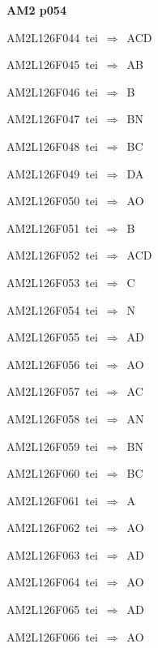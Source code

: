 \par\vfill\eject
{\bf\hfill AM2 p054\hfill\hbox{}}\par\bigskip
{\sixrm AM2L126F044\ {\sixit tei}\ }$\Rightarrow$\ ACD\par\smallskip
{\sixrm AM2L126F045\ {\sixit tei}\ }$\Rightarrow$\ AB\par\smallskip
{\sixrm AM2L126F046\ {\sixit tei}\ }$\Rightarrow$\ B\par\smallskip
{\sixrm AM2L126F047\ {\sixit tei}\ }$\Rightarrow$\ BN\par\smallskip
{\sixrm AM2L126F048\ {\sixit tei}\ }$\Rightarrow$\ BC\par\smallskip
{\sixrm AM2L126F049\ {\sixit tei}\ }$\Rightarrow$\ DA\par\smallskip
{\sixrm AM2L126F050\ {\sixit tei}\ }$\Rightarrow$\ AO\par\smallskip
{\sixrm AM2L126F051\ {\sixit tei}\ }$\Rightarrow$\ B\par\smallskip
{\sixrm AM2L126F052\ {\sixit tei}\ }$\Rightarrow$\ ACD\par\smallskip
{\sixrm AM2L126F053\ {\sixit tei}\ }$\Rightarrow$\ C\par\smallskip
{\sixrm AM2L126F054\ {\sixit tei}\ }$\Rightarrow$\ N\par\smallskip
{\sixrm AM2L126F055\ {\sixit tei}\ }$\Rightarrow$\ AD\par\smallskip
{\sixrm AM2L126F056\ {\sixit tei}\ }$\Rightarrow$\ AO\par\smallskip
{\sixrm AM2L126F057\ {\sixit tei}\ }$\Rightarrow$\ AC\par\smallskip
{\sixrm AM2L126F058\ {\sixit tei}\ }$\Rightarrow$\ AN\par\smallskip
{\sixrm AM2L126F059\ {\sixit tei}\ }$\Rightarrow$\ BN\par\smallskip
{\sixrm AM2L126F060\ {\sixit tei}\ }$\Rightarrow$\ BC\par\smallskip
{\sixrm AM2L126F061\ {\sixit tei}\ }$\Rightarrow$\ A\par\smallskip
{\sixrm AM2L126F062\ {\sixit tei}\ }$\Rightarrow$\ AO\par\smallskip
{\sixrm AM2L126F063\ {\sixit tei}\ }$\Rightarrow$\ AD\par\smallskip
{\sixrm AM2L126F064\ {\sixit tei}\ }$\Rightarrow$\ AO\par\smallskip
{\sixrm AM2L126F065\ {\sixit tei}\ }$\Rightarrow$\ AD\par\smallskip
{\sixrm AM2L126F066\ {\sixit tei}\ }$\Rightarrow$\ AO\par\smallskip
